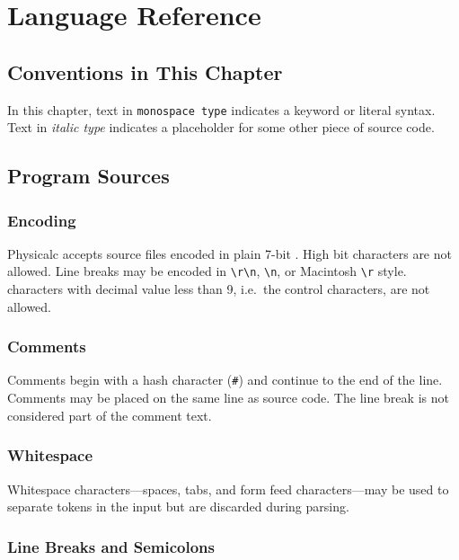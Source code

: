 \chapter{Language Reference}


\section{Conventions in This Chapter}

In this chapter, text in \texttt{monospace type} indicates a keyword
or literal syntax.  Text in \textit{italic type} indicates a
placeholder for some other piece of source code.



\section{Program Sources}
\label{structure}

\subsection{Encoding}

Physicalc accepts source files encoded in plain 7-bit .
High bit characters are not allowed.  Line breaks may be encoded in
 \verb+\r\n+,  \verb+\n+, or Macintosh \verb+\r+
style.   characters with decimal value less than 9,
i.e.\ the control characters, are not allowed.


\subsection{Comments}

Comments begin with a hash character (\verb+#+) and continue to the
end of the line.  Comments may be placed on the same line as source
code.  The line break is not considered part of the comment text.


\subsection{Whitespace}

Whitespace characters---spaces, tabs, and form feed characters---may
be used to separate tokens in the input but are discarded during
parsing.

\subsection{Line Breaks and Semicolons}

